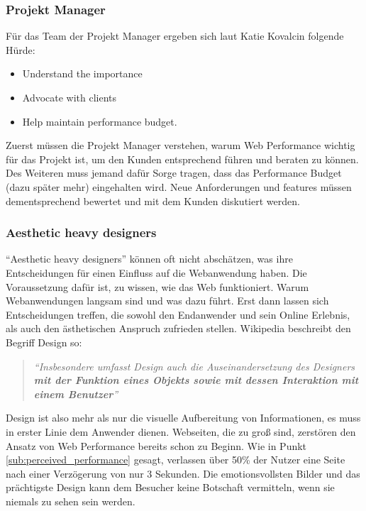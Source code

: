 		\subsubsection{Projekt Manager} %
		\label{ssub:projekt_manager}
			Für das Team der Projekt Manager ergeben sich laut Katie Kovalcin folgende Hürde: \autocite[p. 43]{kovalcin15}\\
			\begin{itemize}
				\item Understand the importance
				\item Advocate with clients
				\item Help maintain performance budget.
			\end{itemize}
			Zuerst müssen die Projekt Manager verstehen, warum Web Performance wichtig für das Projekt ist, um den Kunden entsprechend führen und beraten zu können. Des Weiteren muss jemand dafür Sorge tragen, dass das Performance Budget (dazu später mehr) eingehalten wird. Neue Anforderungen und features müssen dementsprechend bewertet und mit dem Kunden diskutiert werden.\\

		\subsubsection{Aesthetic heavy designers} %
		\label{ssub:aesthetic_heavy_designers}
			"`Aesthetic heavy designers"' können oft nicht abschätzen, was ihre Entscheidungen für einen Einfluss auf die Webanwendung haben. Die Voraussetzung dafür ist, zu wissen, wie das Web funktioniert. Warum Webanwendungen langsam sind und was dazu führt. Erst dann lassen sich Entscheidungen treffen, die sowohl den Endanwender und sein Online Erlebnis, als auch den ästhetischen Anspruch zufrieden stellen. Wikipedia beschreibt den Begriff Design so:

			\begin{quote}
				\textit{"`Insbesondere umfasst Design auch die Auseinandersetzung des Designers \textbf{mit der Funktion eines Objekts sowie mit dessen Interaktion mit einem Benutzer}"'} \autocite{wikipediaDesign}
			\end{quote}

			Design ist also mehr als nur die visuelle Aufbereitung von Informationen, es muss in erster Linie dem Anwender dienen. Webseiten, die zu groß sind, zerstören den Ansatz von Web Performance bereits schon zu Beginn. Wie in Punkt \ref{sub:perceived_performance} gesagt, verlassen über 50\% der Nutzer eine Seite nach einer Verzögerung von nur 3 Sekunden. Die emotionsvollsten Bilder und das prächtigste Design kann dem Besucher keine Botschaft vermitteln, wenn sie niemals zu sehen sein werden.

